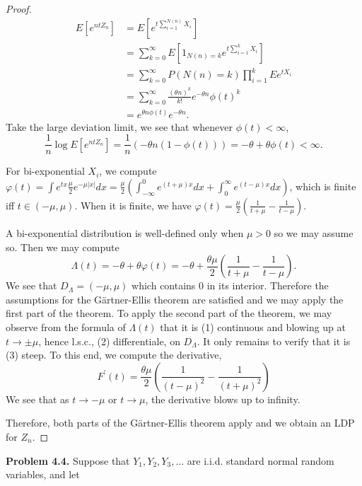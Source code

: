\begin{proof}
	\begin{align*}
		E\left[ e^{n t Z_n} \right] 
		&= E\left[ e^{t \sum_{i=1}^{N(n)} X_i} \right] \\
		&= \sum_{k=0}^{\infty} E\left[ 1_{N(n) = k} e^{t \sum_{i=1}^{k} X_i} \right] \\
		&= \sum_{k=0}^{\infty} P(N(n) = k) \prod_{i=1}^{k} Ee^{t X_i}  \\
		&= \sum_{k=0}^{\infty} \frac{(\theta n)^k}{k!} e^{- \theta n} \phi(t)^k\\
		&= e^{\theta n \phi(t)} e^{- \theta n} 
	.\end{align*}
	Take the large deviation limit, we see that whenever $\phi(t) < \infty $,
	\[
		\frac{1}{n} \log E\left[ e^{n t Z_n} \right]
		= \frac{1}{n}(- \theta n (1 - \phi(t)))
		= - \theta + \theta \phi(t) < \infty 
	.\] 

	For bi-exponential  $X_i$, we compute $\varphi(t) = \int  e^{t x} \frac{\mu}{2}e^{- \mu |x|} dx = \frac{\mu}{2} (\int_{- \infty }^0 e^{(t + \mu)x}dx + \int _0^{\infty } e^{(t - \mu) x} dx )$, which is finite iff $t \in  (-\mu, \mu)$. When it is finite, we have $\varphi(t) = \frac{\mu}{2}\left( \frac{1}{t + \mu} - \frac{1}{t - \mu} \right) $.

	A bi-exponential distribution is well-defined only when $\mu > 0$ so we may assume so. Then we may compute
	\[
		\Lambda(t) = - \theta + \theta \varphi(t)
		= - \theta + \frac{\theta\mu}{2}\left( \frac{1}{t + \mu} - \frac{1}{t - \mu} \right)
	.\] 
	We see that $D_\Lambda = (-\mu, \mu)$ which contains $0$ in its interior. Therefore the assumptions for the Gärtner-Ellis theorem are satisfied and we may apply the first part of the theorem. To apply the second part of the theorem, we may observe from the formula of $\Lambda(t)$ that it is (1) continuous and blowing up at $t \to  \pm \mu$, hence l.s.c., (2) differentiale, on $D_\Lambda$. It only remains to verify that it is (3) steep. To this end, we compute the derivative,
	\[
F^{\prime}(t)=\frac{\theta \mu}{2}\left(\frac{1}{(t-\mu)^2}-\frac{1}{(t+\mu)^2}\right)
\]
We see that as $t \to -\mu$ or $t \to \mu$, the derivative blows up to infinity.

Therefore, both parts of the Gärtner-Ellis theorem apply and we obtain an LDP for $Z_n$.

\end{proof}

\textbf{Problem 4.4.} Suppose that $Y_1, Y_2, Y_3, \ldots$ are i.i.d. standard normal random variables, and let

